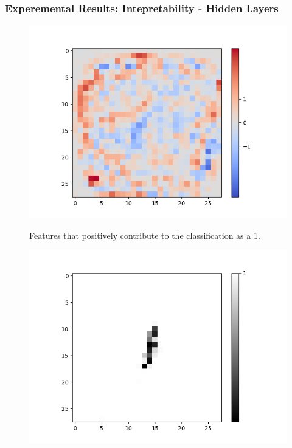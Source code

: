 \documentclass{beamer}
\begin{document}
\begin{frame}
\frametitle{Experemental Results: Intepretability - Hidden Layers}

\noindent
\begin{minipage}[t]{0.4\textwidth}
	\begin{figure}[H]
		\centering
		\begin{minipage}[b]{0.7\textwidth}
			\captionsetup{labelformat=empty}
			\includegraphics[width=\textwidth]{Images/Sigmoid(Hidden-Layer)/Like/Layer0-Neuron-11.png}
			\label{}
		\end{minipage}
		\caption{Features that positively contribute to the classification as a 1.}
		\hfill
	\end{figure}
\end{minipage}
\hspace{0.1\textwidth}
\begin{minipage}[t]{0.4\textwidth}
\begin{figure}[H]
		\centering
		\begin{minipage}[b]{0.7\textwidth}
			\captionsetup{labelformat=empty}
			\includegraphics[width=\textwidth]{Images/AND-OR(W-LSM)(1)/Like/True/Layer0-Neuron-9.png}
			\label{}
		\end{minipage}
		

\end{figure}
\end{minipage}
\end{frame}
\end{document}
